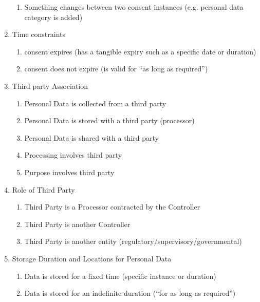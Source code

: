 \begin{enumerate}
  \begin{enumerate}
  \item
    Something changes between two consent instances (e.g. personal data
    category is added)
  \end{enumerate}
\item
  Time constraints

  \begin{enumerate}
  \item
    consent expires (has a tangible expiry such as a specific date or
    duration)
  \item
    consent does not expire (is valid for ``as long as required'')
  \end{enumerate}
\item
  Third party Association

  \begin{enumerate}
  \item
    Personal Data is collected from a third party
  \item
    Personal Data is stored with a third party (processor)
  \item
    Personal Data is shared with a third party
  \item
    Processing involves third party
  \item
    Purpose involves third party
  \end{enumerate}
\item
  Role of Third Party

  \begin{enumerate}
  \item
    Third Party is a Processor contracted by the Controller
  \item
    Third Party is another Controller
  \item
    Third Party is another entity (regulatory/supervisory/governmental)
  \end{enumerate}
\item
  Storage Duration and Locations for Personal Data

  \begin{enumerate}
  \item
    Data is stored for a fixed time (specific instance or duration)
  \item
    Data is stored for an indefinite duration (``for as long as
    required'')
  \end{enumerate}
\end{enumerate}

